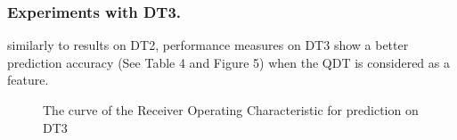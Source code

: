 \subsubsection{Experiments with DT3.}
similarly to results on DT2, performance measures on DT3 show a better prediction accuracy (See Table 4 and Figure 5) when the QDT is considered as a feature.  

\begin{table}[!h]
\centering
{}%
\hspace*{0.5cm}
%
\label{perf-measure-dt3}\caption{Performance measures of the prediction on DT3}
\end{table}

\begin{figure}[!h]
\centering
{}%
\caption{The curve of the Receiver Operating Characteristic for prediction on DT3}\label{curve_roc_dt3}
\end{figure}

